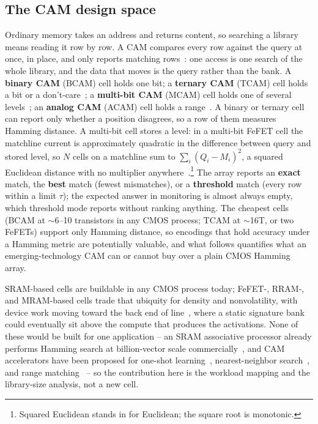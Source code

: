 \documentclass[conference]{IEEEtran}
\newcommand{\cam}{{CAM}\xspace}
\newcommand{\tcam}{{TCAM}\xspace}
\newcommand{\mcam}{{MCAM}\xspace}
\newcommand{\acam}{{ACAM}\xspace}
\newcommand{\fefet}{{FeFET}\xspace}
\newcommand{\fefets}{{FeFETs}\xspace}
\begin{document}
\subsection{The CAM design space}
\label{subsec:CAMspace}
\label{subsec:CAMtech}
Ordinary memory takes an address and returns content, so searching a
library means reading it row by row. A \cam compares every row
against the query at once, in place, and only reports matching
rows~\cite{pagiamtzis2006cam}: one access is one search of the whole
library, and the data that moves is the query rather than the bank.
A \textbf{binary \cam} (BCAM) cell holds one bit; a \textbf{ternary
\cam} (\tcam) cell holds a bit or a don't-care~\cite{ni2019fetcam}; a
\textbf{multi-bit \cam} (\mcam) cell holds one of several
levels~\cite{kazemi2021fefetcam}; an \textbf{analog \cam} (\acam)
cell holds a range~\cite{li2020acam}. A binary or ternary cell can
report only whether a position disagrees, so a row of them measures
Hamming distance. A multi-bit cell stores a level: in a multi-bit
\fefet cell the matchline current is approximately quadratic in the
difference between query and stored level, so $N$ cells on a
matchline sum to $\sum_i (Q_i-M_i)^2$, a squared Euclidean distance
with no multiplier
anywhere~\cite{kazemi2021fefetcam,kazemi2022hdcfefet}.\footnote{Squared
Euclidean stands in for Euclidean; the square root is monotonic.} The
array reports an \textbf{exact}
match, the \textbf{best} match (fewest mismatches), or a
\textbf{threshold} match (every row within a limit $\tau$); the
expected answer in monitoring is almost always empty, which threshold
mode reports without ranking anything. The cheapest cells (BCAM at
$\sim$6--10 transistors in any CMOS process; \tcam at $\sim$16T, or
two \fefets) support only Hamming distance, so encodings that hold accuracy under a Hamming metric are
potentially valuable, and what follows quantifies what an
emerging-technology \cam can or cannot buy over a plain CMOS Hamming
array.

SRAM-based cells are buildable in any CMOS process today; \fefet-,
RRAM-, and MRAM-based cells trade that ubiquity for density and
nonvolatility, with device work moving toward the back end of
line~\cite{dutta2020m3dfefet}, where a static signature bank could
eventually sit above the compute that produces the activations. None
of these would be built for one application -- an SRAM associative
processor already performs Hamming search at billion-vector scale
commercially~\cite{gsi2025apu}, and \cam accelerators have been
proposed for one-shot learning~\cite{ni2019fetcam}, nearest-neighbor
search~\cite{kazemi2021fefetcam}, and range
matching~\cite{li2020acam} -- so the contribution here is the
workload mapping and the library-size analysis, not a new cell.
\end{document}
